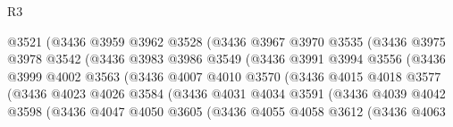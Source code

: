 \begin{lexlean}{R3}
\begin{coremodule}
                            @3521
                            (@3436
                              @3959
                              @3962
                              @3528
                              (@3436
                                @3967
                                @3970
                                @3535
                                (@3436
                                  @3975
                                  @3978
                                  @3542
                                  (@3436
                                    @3983
                                    @3986
                                    @3549
                                    (@3436
                                      @3991
                                      @3994
                                      @3556
                                      (@3436
                                        @3999
                                        @4002
                                        @3563
                                        (@3436
                                          @4007
                                          @4010
                                          @3570
                                          (@3436
                                            @4015
                                            @4018
                                            @3577
                                            (@3436
                                              @4023
                                              @4026
                                              @3584
                                              (@3436
                                                @4031
                                                @4034
                                                @3591
                                                (@3436
                                                  @4039
                                                  @4042
                                                  @3598
                                                  (@3436
                                                    @4047
                                                    @4050
                                                    @3605
                                                    (@3436
                                                      @4055
                                                      @4058
                                                      @3612
                                                      (@3436
                                                        @4063

\end{coremodule}
\end{lexlean}
